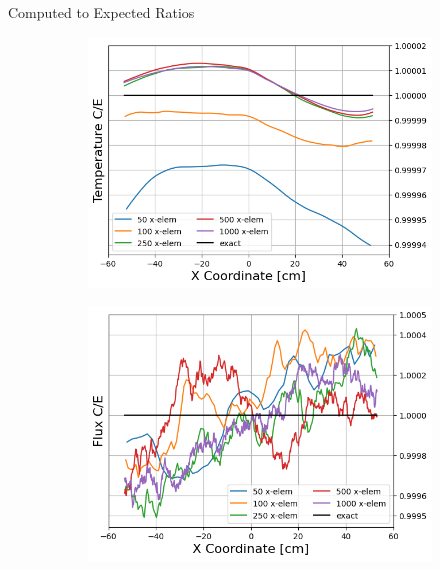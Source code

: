 \documentclass[9pt,t]{beamer}
\begin{document}
\begin{frame}{Computed to Expected Ratios}
    \vspace*{-0.4cm}
    \begin{figure}[T]
        \hspace*{-0.87cm}
        \begin{subfigure}{0.495\linewidth}
            \includegraphics[height=0.85\linewidth]{figures/fine_temp_num_to_analy_ratios.png}
        \end{subfigure}\hspace*{0.85cm}
        \begin{subfigure}{0.495\linewidth}
            \includegraphics[height=0.85\linewidth]{figures/fine_flux_num_to_analy_ratios.png}

\end{subfigure}
\end{figure}
\end{frame}
\end{document}
